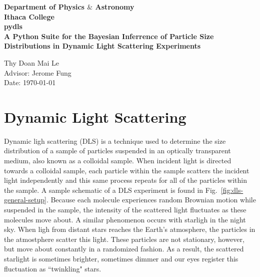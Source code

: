 \documentclass[11pt]{article}
\begin{document}
\begin{titlepage}
    \begin{center}
        \vspace*{0.5cm}
      	\LARGE{\textbf{Department of Physics $\&$ Astronomy}}\\
      	\vspace{0.2cm}
      	\textbf{Ithaca College}\\
      	
      	\vspace{5cm}
      	\textbf{\LARGE{pydls }}\\
	\vspace{0.5cm}
      	\textbf{\LARGE{A Python Suite for the Bayesian Inferrence of Particle Size Distributions in Dynamic Light Scattering Experiments}}\\
      	\vspace{4cm}
	
      	\normalsize{
      	 Thy Doan Mai Le\\
	 Advisor: Jerome Fung\\
	 \vspace{4cm}
      	Date: \today\\}
      	\vspace{2cm}
      	
      
    \end{center}
\end{titlepage}
\tableofcontents

\newpage
\section{Dynamic Light Scattering}
\justifying
\indent Dynamic ligh scattering (DLS) is a technique used to determine the size distribution of a sample of particles suspended in an optically transparent medium, also known as a colloidal sample. When incident light is directed towards a colloidal sample, each particle within the sample scatters the incident light independently and this same process repeats for all of the particles within the sample. A sample schematic of a DLS experiment is found in Fig.~\ref{fig:dls-general-setup}. Because each molecule experiences random Brownian motion while suspended in the sample, the intensity of the scattered light fluctuates as these molecules move about. A similar phenomenon occurs with starligh in the night sky. When ligh from distant stars reaches the Earth's atmosphere, the particles in the atmostphere scatter this light. These particles are not stationary, however, but move about constantly in a randomized fashion. As a result, the scattered starlight is sometimes brighter, sometimes dimmer and our eyes register this fluctuation as ``twinkling" stars. 
\end{document}
